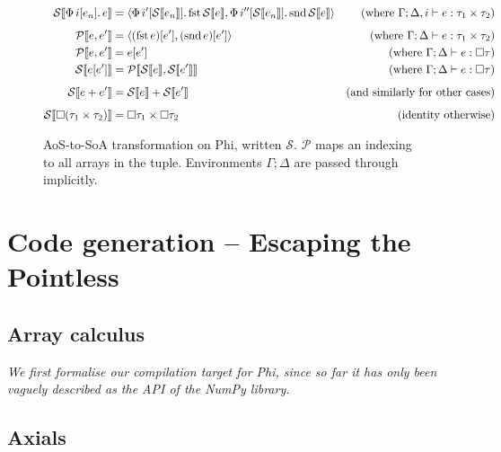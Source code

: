 \newcommand{\phisoa}[1]{\mathcal S \left\llbracket {#1} \right\rrbracket}

\begin{figure}[h]
    \centering
    \begin{align*}
\phisoa {\phivec{i}{e_n}{e}}
&= \phipair{\phivec{i'}{\phisoa{e_n}}{\phifst{\phisoa{e}}}}{\phivec{i''}{\phisoa{e_n}}{\phisnd{\phisoa{e}}}}
&\text{(where }\Gamma; \Delta, i \vdash e : \phipairtype{\tau_1}{\tau_2} \text{)} \\[0.5em]
\mathcal P \left\llbracket e, e' \right\rrbracket
&= \phipair{(\phifst{e})[e']}{(\phisnd{e})[e']}
&\text{(where }\Gamma; \Delta \vdash e : \phipairtype{\tau_1}{\tau_2} \text{)} \\
\mathcal P \left\llbracket e, e' \right\rrbracket
&= e\left[ e' \right]
&\text{(where }\Gamma; \Delta \vdash e : \phivectype{\tau} \text{)} \\
\mathcal S \left\llbracket e[e'] \right\rrbracket
&= \mathcal P \left\llbracket \phisoa{e}, \phisoa{e'} \right \rrbracket
&\text{(where }\Gamma; \Delta \vdash e : \phivectype{\tau} \text{)} \\[0.5em]
\phisoa{e + e'}
&= \phisoa{e} + \phisoa{e'}
&\text{(and similarly for other cases)} \\[0.5em]
\phisoa{\phivectype{(\phipairtype{\tau_1}{\tau_2}})} &= \phipairtype{\phivectype{\tau_1}}{\phivectype{\tau_2}} &\text{(identity otherwise)}
    \end{align*}
    \caption{AoS-to-SoA transformation on Phi, written $\mathcal S$. $\mathcal P$ maps an indexing to all arrays in the tuple. Environments $\Gamma; \Delta$ are passed through implicitly.}
    \label{fig:aos-to-soa}
\end{figure}

\section{Code generation -- Escaping the Pointless}

\subsection{Array calculus}

\textit{We first formalise our compilation target for Phi, since so far it has only been vaguely described as the API of the NumPy library.} \todothis

\subsection{Axials}

